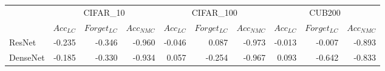 \begin{table}[h]
\centering
\begin{tabular}{lrrrrrrrrr}
\toprule
{} & \multicolumn{3}{c}{CIFAR_10} & \multicolumn{3}{c}{CIFAR_100} & \multicolumn{3}{c}{CUB200} \\
{} & $Acc_{LC}$ & $Forget_{LC}$ & $Acc_{NMC}$ & $Acc_{LC}$ & $Forget_{LC}$ & $Acc_{NMC}$ & $Acc_{LC}$ & $Forget_{LC}$ & $Acc_{NMC}$ \\
\midrule
ResNet   &     -0.235 &        -0.346 &      -0.960 &     -0.046 &         0.087 &      -0.973 &     -0.013 &        -0.007 &      -0.893 \\
DenseNet &     -0.185 &        -0.330 &      -0.934 &      0.057 &        -0.254 &      -0.967 &      0.093 &        -0.642 &      -0.833 \\
\bottomrule
\end{tabular}
\end{table}
